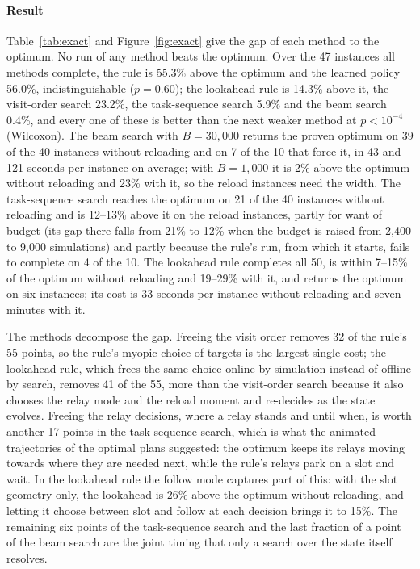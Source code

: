 \documentclass[final,5p,times,twocolumn]{elsarticle}
\begin{document}
\paragraph{Result}
Table~\ref{tab:exact} and Figure~\ref{fig:exact} give the gap of each method to the optimum. No
run of any method beats the optimum. Over the 47 instances all methods complete, the rule is
55.3\% above the optimum and the learned policy 56.0\%, indistinguishable ($p = 0.60$); the
lookahead rule is 14.3\% above it, the visit-order search 23.2\%, the task-sequence search
5.9\% and the beam search 0.4\%, and every one of these is better than the next weaker method at
$p < 10^{-4}$ (Wilcoxon). The beam search with $B = 30{,}000$ returns the proven optimum on 39 of
the 40 instances without reloading and on 7 of the 10 that force it, in 43 and 121 seconds per
instance on average; with $B = 1{,}000$ it is 2\% above the optimum without reloading and 23\%
with it, so the reload instances need the width. The task-sequence search reaches the optimum on
21 of the 40 instances without reloading and is 12--13\% above it on the reload instances,
partly for want of budget (its gap there falls from 21\% to 12\% when the budget is raised from
2{,}400 to 9{,}000 simulations) and partly because the rule's run, from which it starts, fails to
complete on 4 of the 10. The lookahead rule completes all 50, is within 7--15\% of the optimum
without reloading and 19--29\% with it, and returns the optimum on six instances; its cost is
33 seconds per instance without reloading and seven minutes with it.

The methods decompose the gap. Freeing the visit order removes 32 of the rule's 55 points, so the
rule's myopic choice of targets is the largest single cost; the lookahead rule, which frees the
same choice online by simulation instead of offline by search, removes 41 of the 55, more than the
visit-order search because it also chooses the relay mode and the reload moment and re-decides
as the state evolves. Freeing the relay decisions, where a relay stands and until when, is worth
another 17 points in the task-sequence search, which is what the animated trajectories of the
optimal plans suggested: the optimum keeps its relays moving towards where they are needed next,
while the rule's relays park on a slot and wait. In the lookahead rule the follow mode captures
part of this: with the slot geometry only, the lookahead is 26\% above the optimum without
reloading, and letting it choose between slot and follow at each decision brings it to 15\%.
The remaining six points of the task-sequence search and the last fraction of a point of the
beam search are the joint timing that only a search over the state itself resolves.
\end{document}
